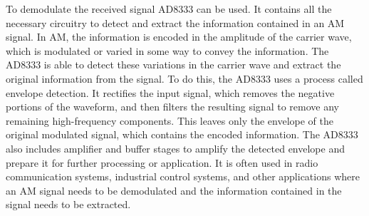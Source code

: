 To demodulate the received signal AD8333\cite{AD8333} can be used. It contains all the necessary circuitry to detect and extract the information contained in an AM signal. In AM, the information is encoded in the amplitude of the carrier wave, which is modulated or varied in some way to convey the information. The AD8333 is able to detect these variations in the carrier wave and extract the original information from the signal. To do this, the AD8333 uses a process called envelope detection. It rectifies the input signal, which removes the negative portions of the waveform, and then filters the resulting signal to remove any remaining high-frequency components. This leaves only the envelope of the original modulated signal, which contains the encoded information. The AD8333 also includes amplifier and buffer stages to amplify the detected envelope and prepare it for further processing or application. It is often used in radio communication systems, industrial control systems, and other applications where an AM signal needs to be demodulated and the information contained in the signal needs to be extracted.

